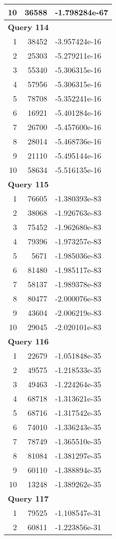 \begin{longtable}[{p}]{@{}rrp{}@{}}
10 & 36588 & -1.798284e-67 \\
\midrule
\multicolumn{3}{l}{\bfseries Query 114} \\
1 & 38452 & -3.957424e-16 \\
2 & 25303 & -5.279211e-16 \\
3 & 55340 & -5.306315e-16 \\
4 & 57956 & -5.306315e-16 \\
5 & 78708 & -5.352241e-16 \\
6 & 16921 & -5.401284e-16 \\
7 & 26700 & -5.457600e-16 \\
8 & 28014 & -5.468736e-16 \\
9 & 21110 & -5.495144e-16 \\
10 & 58634 & -5.516135e-16 \\
\midrule
\multicolumn{3}{l}{\bfseries Query 115} \\
1 & 76605 & -1.380393e-83 \\
2 & 38068 & -1.926763e-83 \\
3 & 75452 & -1.962680e-83 \\
4 & 79396 & -1.973257e-83 \\
5 & 5671 & -1.985036e-83 \\
6 & 81480 & -1.985117e-83 \\
7 & 58137 & -1.989378e-83 \\
8 & 80477 & -2.000076e-83 \\
9 & 43604 & -2.006219e-83 \\
10 & 29045 & -2.020101e-83 \\
\midrule
\multicolumn{3}{l}{\bfseries Query 116} \\
1 & 22679 & -1.051848e-35 \\
2 & 49575 & -1.218533e-35 \\
3 & 49463 & -1.224264e-35 \\
4 & 68718 & -1.313621e-35 \\
5 & 68716 & -1.317542e-35 \\
6 & 74010 & -1.336243e-35 \\
7 & 78749 & -1.365510e-35 \\
8 & 81084 & -1.381297e-35 \\
9 & 60110 & -1.388894e-35 \\
10 & 13248 & -1.389262e-35 \\
\midrule
\multicolumn{3}{l}{\bfseries Query 117} \\
1 & 79525 & -1.108547e-31 \\
2 & 60811 & -1.223856e-31 \\

\end{longtable}

